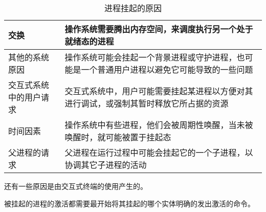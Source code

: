 {{{{                \begin{table}[htb]
                    \centering

                    \caption{进程挂起的原因}

                    \begin{tabular}{l|l}
                        \hline
                        交换 & 操作系统需要腾出内存空间，来调度执行另一个处于就绪态的进程 \\
                        \hline
                        其他的系统原因 & 操作系统可能会挂起一个背景进程或守护进程，也可能是一个普通用户进程以避免它可能导致的一些问题 \\
                        \hline
                        交互式系统中的用户请求 & 交互式系统中，用户可能需要挂起某进程以方便对其进行调试，或强制其暂时释放它所占据的资源 \\
                        \hline
                        时间因素 & 操作系统中有些进程，他们会被周期性唤醒，当未被唤醒时，就可能被置于挂起态 \\
                        \hline
                        父进程的请求 & 父进程在运行过程中可能会挂起它的一个子进程，以协调其它子进程的活动 \\
                        \hline
                    \end{tabular}
                \end{table}

                还有一些原因是由交互式终端的使用产生的。

                被挂起的进程的激活都需要最开始将其挂起的哪个实体明确的发出激活的命令。
            }
        }
    }
}
